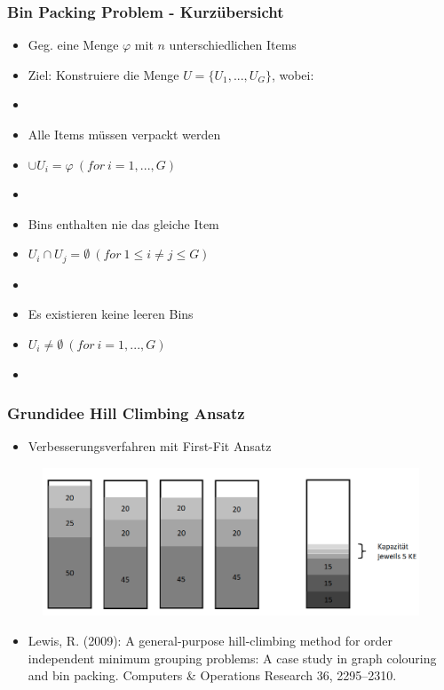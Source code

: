 \documentclass{beamer}
\begin{document}
\begin{frame}
\frametitle{Bin Packing Problem - Kurzübersicht}
\begin{footnotesize}
\begin{itemize}
\item Geg. eine Menge $\varphi$ mit $n$ unterschiedlichen Items
\item Ziel: Konstruiere die Menge $U=\{U_1,...,U_G\}$, wobei:
\item[]
\item Alle Items müssen verpackt werden
\item[] $\cup U_i = \varphi \ (for \ i = 1,...,G)$
\item[]
\item Bins enthalten nie das gleiche Item
\item[] $U_i \cap U_j = \emptyset \ (for \ 1 \leq i\neq j \leq G )$
\item[]
\item Es existieren keine leeren Bins
\item[] $U_i\neq \emptyset \ (for \ i=1,...,G)$
\item[]
\end{itemize}
\end{footnotesize}
\end{frame}
\begin{frame}
\frametitle{Grundidee Hill Climbing Ansatz}
\begin{footnotesize}
\begin{itemize}
\item Verbesserungsverfahren mit First-Fit Ansatz
\end{itemize}
\end{footnotesize}
\begin{figure}[!htbp]
\begin{center}
\includegraphics[scale=0.25]{img/HC_idee.png}
\end{center}
\end{figure}

\begin{scriptsize}
\begin{itemize}
\item Lewis, R. (2009): A general-purpose hill-climbing method for order independent minimum grouping problems: A case study in graph colouring and bin packing. Computers & Operations Research 36, 2295–2310.
\end{itemize}
\end{scriptsize}
\end{frame}
\end{document}
